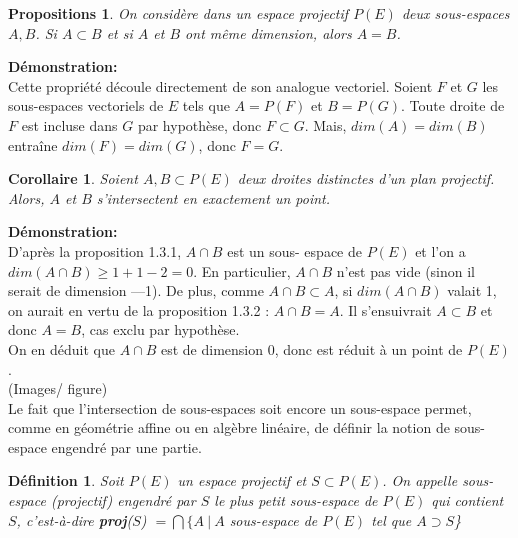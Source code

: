 \documentclass[12pt]{report}
\newtheorem{corollaire}{Corollaire}[section]
\newtheorem{madef}{Définition}[section]
\newtheorem{propos}{Propositions}[section]
\begin{document}
\begin{propos}
	On considère dans un espace projectif $P(E)$ 
	deux sous-espaces $A, B$. Si $A \subset B$ et si $A$ et $B$ ont même  
	dimension, alors $A = B$.
\end{propos}
\textbf{Démonstration:}\\
Cette propriété découle directement de son  
analogue vectoriel. Soient $F$ et $G$ les sous-espaces vectoriels de $E$ 
tels que $A = P(F)$ et $B = P(G)$. Toute droite de $F$ est incluse 
dans $G$ par hypothèse, donc $F \subset G$. Mais, $dim (A) = dim(B)$
entraîne  $dim(F) = dim(G)$, donc $F = G$. 
\begin{corollaire}
	Soient $A, B \subset  P(E)$ deux droites distinctes 
	d'un plan projectif. Alors, $A$ et $B$ s'intersectent en exactement un 
	point. 
\end{corollaire}
\textbf{Démonstration:}\\
D'après la proposition 1.3.1, $A \cap B$ est un sous- 
espace de $P(E)$ et l'on a $dim(A \cap B) \geq 1 + 1-2 = 0$. En particulier, 
$A \cap B$ n'est pas vide (sinon il serait de dimension —1). 
De plus, comme $A \cap B \subset A$, si $dim(A \cap B)$ valait 1, on aurait en 
vertu de la proposition 1.3.2 : $A \cap B = A$. Il s'ensuivrait $A \subset B$ 
et donc $A = B$, cas exclu par hypothèse. \\
On en déduit que $A \cap B$ est de dimension 0, donc est réduit à un 
point de $P(E)$. \\
(Images/ figure)
\\
Le fait que l'intersection de sous-espaces soit encore un sous-espace 
permet, comme en géométrie affine ou en algèbre linéaire, de  
définir la notion de sous-espace engendré par une partie. 
\begin{madef}
	Soit $P(E)$ un espace projectif et $S \subset P(E)$. 
	On appelle sous-espace (projectif) engendré par $S$ le plus petit 
	sous-espace de $P(E)$ qui contient $S$, c'est-à-dire 
	\textbf{proj}($S$) $= \bigcap \{ A\ |\ A$ sous-espace de $P(E)$ tel que $A \supset S$\} 
\end{madef}
\end{document}
